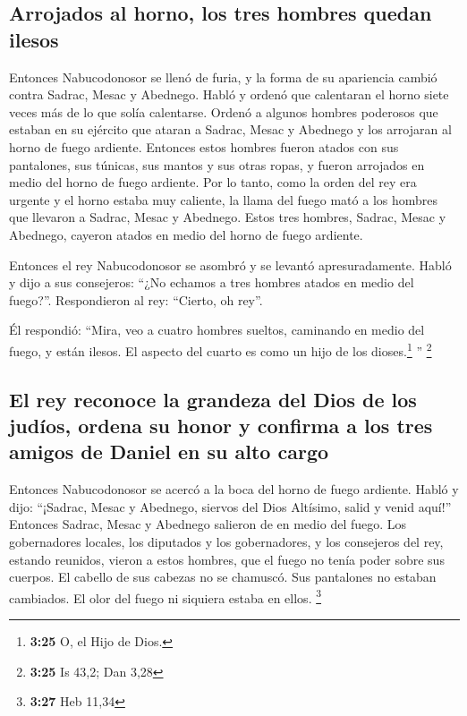 \hypertarget{arrojados-al-horno-los-tres-hombres-quedan-ilesos}{%
\subsection{Arrojados al horno, los tres hombres quedan
ilesos}\label{arrojados-al-horno-los-tres-hombres-quedan-ilesos}}

 Entonces Nabucodonosor se llenó de furia, y la forma de
su apariencia cambió contra Sadrac, Mesac y Abednego. Habló y ordenó que
calentaran el horno siete veces más de lo que solía calentarse.
 Ordenó a algunos hombres poderosos que estaban en su
ejército que ataran a Sadrac, Mesac y Abednego y los arrojaran al horno
de fuego ardiente.  Entonces estos hombres fueron atados
con sus pantalones, sus túnicas, sus mantos y sus otras ropas, y fueron
arrojados en medio del horno de fuego ardiente.  Por lo
tanto, como la orden del rey era urgente y el horno estaba muy caliente,
la llama del fuego mató a los hombres que llevaron a Sadrac, Mesac y
Abednego.  Estos tres hombres, Sadrac, Mesac y Abednego,
cayeron atados en medio del horno de fuego ardiente.

 Entonces el rey Nabucodonosor se asombró y se levantó
apresuradamente. Habló y dijo a sus consejeros: ``¿No echamos a tres
hombres atados en medio del fuego?''. Respondieron al rey: ``Cierto, oh
rey''.

 Él respondió: ``Mira, veo a cuatro hombres sueltos,
caminando en medio del fuego, y están ilesos. El aspecto del cuarto es
como un hijo de los dioses.\footnote{\textbf{3:25} O, el Hijo de Dios.}
'' \footnote{\textbf{3:25} Is 43,2; Dan 3,28}

\hypertarget{el-rey-reconoce-la-grandeza-del-dios-de-los-juduxedos-ordena-su-honor-y-confirma-a-los-tres-amigos-de-daniel-en-su-alto-cargo}{%
\subsection{El rey reconoce la grandeza del Dios de los judíos, ordena
su honor y confirma a los tres amigos de Daniel en su alto
cargo}\label{el-rey-reconoce-la-grandeza-del-dios-de-los-juduxedos-ordena-su-honor-y-confirma-a-los-tres-amigos-de-daniel-en-su-alto-cargo}}

 Entonces Nabucodonosor se acercó a la boca del horno de
fuego ardiente. Habló y dijo: ``¡Sadrac, Mesac y Abednego, siervos del
Dios Altísimo, salid y venid aquí!'' Entonces Sadrac, Mesac y Abednego
salieron de en medio del fuego.  Los gobernadores
locales, los diputados y los gobernadores, y los consejeros del rey,
estando reunidos, vieron a estos hombres, que el fuego no tenía poder
sobre sus cuerpos. El cabello de sus cabezas no se chamuscó. Sus
pantalones no estaban cambiados. El olor del fuego ni siquiera estaba en
ellos. \footnote{\textbf{3:27} Heb 11,34}

